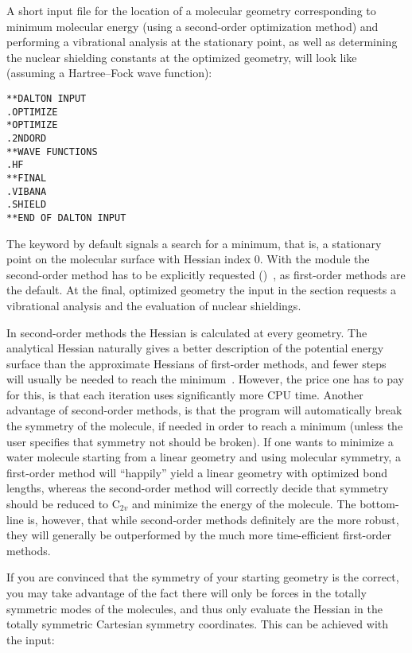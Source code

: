 A short input file for the location of a molecular geometry
corresponding to minimum molecular energy
(using a second-order optimization
method) and performing a vibrational
analysis at the stationary point, as well
as determining the nuclear
shielding constants at the optimized
geometry, will look like
(assuming a Hartree--Fock wave function):

\begin{verbatim}
**DALTON INPUT
.OPTIMIZE
*OPTIMIZE
.2NDORD
**WAVE FUNCTIONS
.HF
**FINAL
.VIBANA
.SHIELD
**END OF DALTON INPUT
\end{verbatim}

The keyword  by default signals a search for a minimum,
that is, a stationary point on the molecular surface with Hessian
index 0. With the 
module the second-order method has to be explicitly requested
()~\cite{tuhjahjajpjjcp84}, as first-order methods are the default. At the final,
optimized geometry the input in the  section requests a
vibrational analysis and the evaluation of nuclear shieldings.

In second-order methods the Hessian is calculated at every
geometry. The analytical Hessian naturally gives a better description
of the potential energy surface than the approximate Hessians of
first-order methods, and fewer steps will usually be needed to reach
the minimum~\cite{vbthjcp117}. However, the price one has to pay for this, is that each
iteration uses significantly more CPU time. Another advantage of
second-order methods, is that the program will automatically break the symmetry
of the molecule, if needed in order to reach a minimum
(unless the user specifies that symmetry not should be broken). If
one wants to minimize a water molecule starting from a linear
geometry and using molecular symmetry, a first-order method will
``happily'' yield a linear geometry with optimized bond lengths, whereas
the second-order method will correctly decide that symmetry should be
reduced to C$_{2v}$ and minimize the energy of the molecule.
The bottom-line is, however, that while second-order methods
definitely are the more robust, they will generally be outperformed by
the much more time-efficient first-order methods.

If you are convinced that the symmetry of your starting geometry
is the correct, you may take advantage of the fact there will only
be forces in the totally symmetric modes of the molecules,
and thus only evaluate the Hessian in the totally symmetric
Cartesian symmetry coordinates. This can be achieved with the
input:

